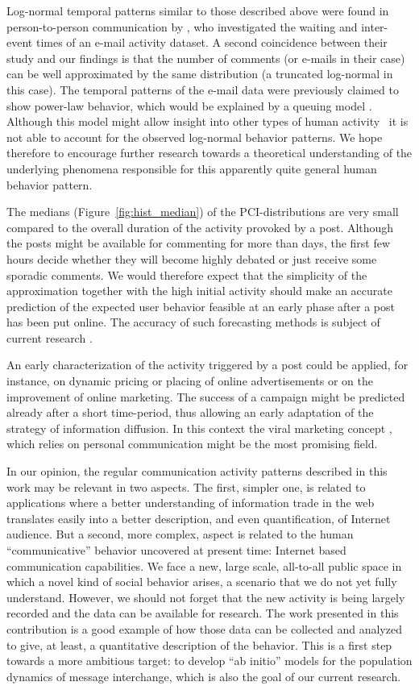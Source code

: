 \documentclass[twoside,11pt]{article}
\begin{document}
Log-normal temporal patterns similar to those described above were
found in person-to-person communication by \citet{Stouffer06},
who investigated the waiting and inter-event
times of an e-mail activity dataset. A second coincidence between
their study and our findings is that the number of comments (or
e-mails in their case) can be well approximated by the same
distribution (a truncated log-normal in this case).  The temporal
patterns of the e-mail data were previously claimed to show power-law
behavior, which would be explained by a queuing model
\citep{barabasi05}.  Although this model might allow insight into other
types of human activity~\citep{Vazquez06} it is not able to account for
the observed log-normal behavior patterns. We hope therefore to
encourage further research towards a theoretical understanding of the
underlying phenomena responsible for this apparently quite general
human behavior pattern.

The medians (Figure~\ref{fig:hist_median}) of the PCI-distributions
are very small compared to the overall duration of the activity
provoked by a post.  Although the posts might be available for
commenting for more than  days, the first few hours decide whether
they will become highly debated or just receive some sporadic
comments.  We would therefore expect that the simplicity of the
approximation together with the high initial activity should make an
accurate prediction of the expected user behavior feasible at an early
phase after a post has been put online.  The accuracy of such
forecasting methods is subject of current research
\citep{kaltenbrunner_LAWEB2007}.

An early characterization of the activity triggered by a post could be
applied, for instance, on dynamic pricing or placing of online
advertisements or on the improvement of online marketing. The success
of a campaign might be predicted already after a short time-period,
thus allowing an early adaptation of the strategy of information
diffusion. In this context the viral marketing concept
\citep{Leskovec06}, which relies on personal communication might be the
most promising field.

In our opinion, the regular communication activity patterns described
in this work may be relevant in two aspects. The first, simpler one,
is related to applications where a better understanding of information
trade in the web translates easily into a better description, and even
quantification, of Internet audience.  But a second, more complex,
aspect is related to the human ``communicative'' behavior uncovered at
present time: Internet based communication capabilities. We face a
new, large scale, all-to-all public space in which a novel kind of
social behavior arises, a scenario that we do not yet fully
understand. However, we should not forget that the new activity is
being largely recorded and the data can be available for research.
The work presented in this contribution is a good example of how those
data can be collected and analyzed to give, at least, a quantitative
description of the behavior.  This is a first step towards a more
ambitious target: to develop ``ab initio'' models for the population
dynamics of message interchange, which is also the goal of our current
research.
\end{document}

